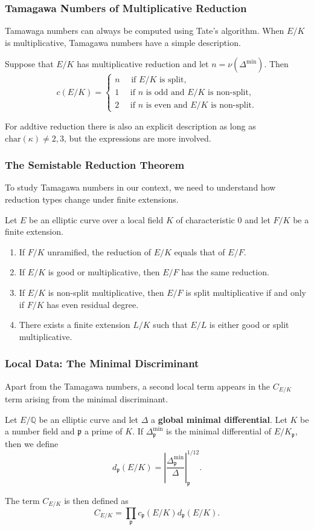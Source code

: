 \documentclass{beamer}
\newcommand{\QQ}{\mathbb{Q}}
\newcommand{\pp}{\mathfrak{p}}
\theoremstyle{plain}
\begin{document}
\begin{frame}
    \frametitle{Tamagawa Numbers of Multiplicative Reduction}
    Tamawaga numbers can always be computed using Tate's algorithm. When $E/K$ is multiplicative, Tamagawa numbers have a simple description.
    \begin{lemma}
        Suppose that $E/K$ has multiplicative reduction and let $n=\nu(\Delta^{\min})$. Then
        \[
        c(E/K)=
        \begin{cases}
            n\quad \text{ if $E/K$ is split,}\\
            1\quad \text{ if $n$ is odd and $E/K$ is non-split,}\\
            2\quad \text{ if $n$ is even and $E/K$ is non-split.}
        \end{cases}    
        \] 
    \end{lemma}

    For addtive reduction there is also an explicit description as long as $\mathrm{char}(\kappa)\neq 2,3$, but the expressions are more involved.

\end{frame}

\begin{frame}
    \frametitle{The Semistable Reduction Theorem}
    To study Tamagawa numbers in our context, we need to understand how reduction types change under finite extensions.
    \begin{lemma}
        Let $E$ be an elliptic curve over a local field $K$ of characteristic $0$ and let $F/K$ be a finite extension.
        \begin{enumerate}
            \item If $F/K$ unramified, the reduction of $E/K$ equals that of $E/F$.
            \item If $E/K$ is good or multiplicative, then $E/F$ has the same reduction.
            \item If $E/K$ is non-split multiplicative, then $E/F$ is split multiplicative if and only if $F/K$ has even residual degree. 
            \item There exists a finite extension $L/K$ such that $E/L$ is either good or split multiplicative.
        \end{enumerate}
    \end{lemma}    

\end{frame}

\begin{frame}
    \frametitle{Local Data: The Minimal Discriminant}
    Apart from the Tamagawa numbers, a second local term appears in the $C_{E/K}$ term arising from the minimal discriminant.
    \begin{definition}
        Let $E/\QQ$ be an elliptic curve and let $\Delta$ a \textbf{global minimal differential}. Let $K$ be a number field and $\pp$ a prime of $K$. If $\Delta_{\pp}^{\min}$ is the minimal differential of $E/K_\pp$, then we define 
        $$d_\pp(E/K)=\left|\frac{\Delta_\pp^{\min}}{\Delta}\right|_\pp^{1/12}.$$
    \end{definition}
    The term $C_{E/K}$ is then defined as 
    $$C_{E/K}=\prod_{\pp}c_\pp(E/K)d_\pp(E/K).$$
\end{frame}
\end{document}
